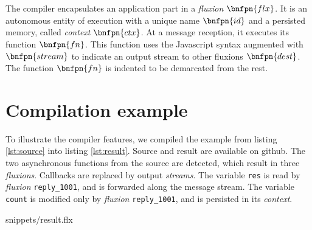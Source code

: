 \vspace{-1\baselineskip}
\begin{bnf*}
      { \bnfor {} \bnfsp {} \bnfsp {}}\\
      { \bnfsp {} \bnfsp {} \bnfsp {} \bnfsp {} \bnfsp {} \bnfsp {}}\\
      { \bnfor {} \bnfor {} \bnfsp {} \bnfsp {}}\\
       { \bnfsp {} }\\
         {}\\
          {\bnfts{\texttt{\{}}  \bnfts{\texttt{\}}}}\\
          {\bnfts{\texttt{[}}  \bnfts{\texttt{]}}}\\
         { \bnfor {} \bnfsp \bnfts{,} \bnfsp {}}\\
           {\bnfts{\texttt{>}\texttt{>}} \bnfor \bnfts{\texttt{-}\texttt{>}}}\\
           {}\\
           {}\\
\end{bnf*}
\vspace{-1.5\baselineskip}~\\
The compiler encapsulates an application part in a \textit{fluxion} $\bnfpn{flx}$.
It is an autonomous entity of execution with a unique name $\bnfpn{id}$ and a persisted memory, called \textit{context} $\bnfpn{ctx}$.
At a message reception, it executes its function $\bnfpn{fn}$.
This function uses the Javascript syntax augmented with $\bnfpn{stream}$ to indicate an output stream to other fluxions $\bnfpn{dest}$.
The function $\bnfpn{fn}$ is indented to be demarcated from the rest.

\section{Compilation example} \label{section:example}

To illustrate the compiler features, we compiled the example from listing \ref{lst:source} into listing \ref{lst:result}.
Source and result are available on github\cite{flx-example}.
The two asynchronous functions from the source are detected, which result in three \textit{fluxions}.
Callbacks are replaced by output \textit{streams}.
The variable \texttt{res} is read by \textit{fluxion} \texttt{reply\_1001}, and is forwarded along the message stream.
The variable \texttt{count} is modified only by \textit{fluxion} \texttt{reply\_1001}, and is persisted in its \textit{context}.

{snippets/result.flx}

\vfill\eject
